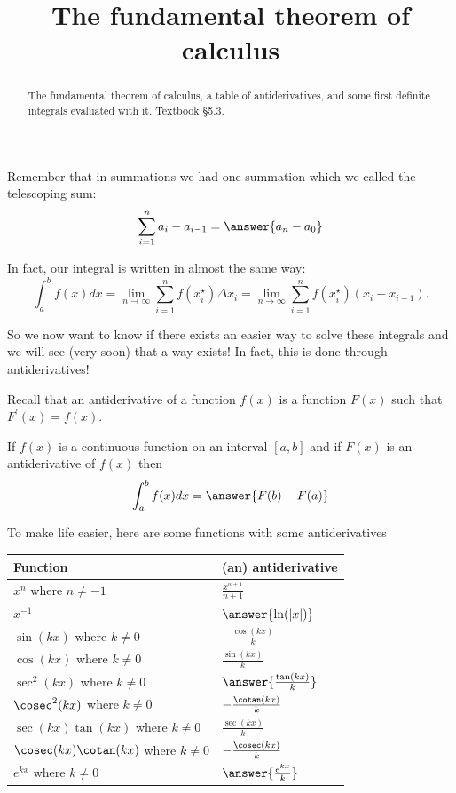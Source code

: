 \documentclass{ximera}
\title{The fundamental theorem of calculus}
\begin{document}
\begin{abstract}
The fundamental theorem of calculus, a table of antiderivatives, and some first definite integrals evaluated with it. Textbook §5.3.
\end{abstract}
\maketitle

Remember that in summations we had one summation which we called the telescoping sum:
\[
\sum_{i=1}^{n} a_{i}-a_{i-1}=\answer{a_{n}-a_{0}}
\]

In fact, our integral is written in almost the same way:
\[
\int_{a}^{b} f(x) d x=\lim _{n \rightarrow \infty} \sum_{i=1}^{n} f\left(x_{i}^{\star}\right) \Delta x_{i}=\lim _{n \rightarrow \infty} \sum_{i=1}^{n} f\left(x_{i}^{\star}\right)\left(x_{i}-x_{i-1}\right) .
\]

So we now want to know if there exists an easier way to solve these integrals and we will see (very soon) that a way exists! In fact, this is done through antiderivatives!

Recall that an antiderivative of a function $f(x)$ is a function $F(x)$ such that $F^{\prime}(x)=f(x)$.

\begin{theorem}\label{theorem:13-1}
If $f(x)$ is a continuous function on an interval $[a, b]$ and if $F(x)$ is an antiderivative of $f(x)$ then
\[
\int_{a}^{b} f(x) d x=\answer{F(b)-F(a)}
\]
\end{theorem}

To make life easier, here are some functions with some antiderivatives

\begin{center}
\begin{tabular}[t]{|l|l|}
\hline
Function & (an) antiderivative \\
\hline
$x^{n}$ where $n \neq-1$ & $\frac{x^{n+1}}{n+1}$ \\
\hline
$x^{-1}$ & $\answer{\ln(|x|)}$ \\
\hline
$\sin (k x)$ where $k \neq 0$ & $-\frac{\cos (k x)}{k}$ \\
\hline
$\cos (k x)$ where $k \neq 0$ & $\frac{\sin (k x)}{k}$ \\
\hline
$\sec ^{2}(k x)$ where $k \neq 0$ & $\answer{\frac{\tan(kx)}{k}}$ \\
\hline
$\cosec^{2}(k x)$ where $k \neq 0$ & $-\frac{\cotan(k x)}{k}$ \\
\hline
$\sec (k x) \tan (k x)$ where $k \neq 0$ & $\frac{\sec (k x)}{k}$ \\
\hline
$\cosec(k x) \cotan(k x)$ where $k \neq 0$ & $-\frac{\cosec(k x)}{k}$ \\
\hline
$e^{k x}$ where $k \neq 0$ & $\answer{\frac{e^{kx}}{k}}$ \\
\hline
\end{tabular}
\end{center}
\end{document}
